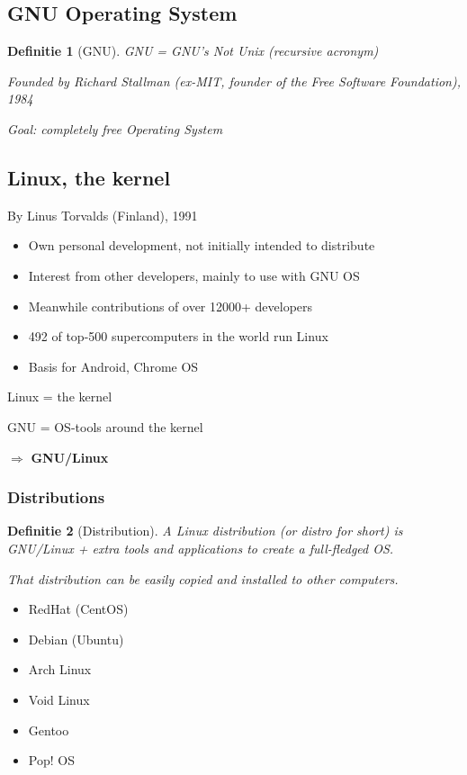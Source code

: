 \documentclass{article}
\newtheorem{theorem}{Definitie}[section]
\begin{document}
\subsection{GNU Operating System}

\begin{theorem}[GNU]
GNU = GNU's Not Unix (recursive acronym)

Founded by Richard Stallman (ex-MIT, founder of the Free Software Foundation), 1984

Goal: completely free Operating System
\end{theorem}

\subsection{Linux, the kernel}

By Linus Torvalds (Finland), 1991

\begin{itemize}
    \item Own personal development, not initially intended to distribute
    \item Interest from other developers, mainly to use with GNU OS
    \item Meanwhile contributions of over 12000+ developers
    \item 492 of top-500 supercomputers in the world run Linux
    \item Basis for Android, Chrome OS
\end{itemize}

Linux = the kernel

GNU = OS-tools around the kernel

$\Rightarrow$ \textbf{GNU/Linux}

\subsubsection{Distributions}

\begin{theorem}[Distribution]
A Linux distribution (or distro for short) is GNU/Linux + extra tools and applications to create a full-fledged OS.

That distribution can be easily copied and installed to other computers.
\end{theorem}

\begin{itemize}
    \item RedHat (CentOS)
    \item Debian (Ubuntu)
    \item Arch Linux
    \item Void Linux
    \item Gentoo
    \item Pop! OS
\end{itemize}
\end{document}
